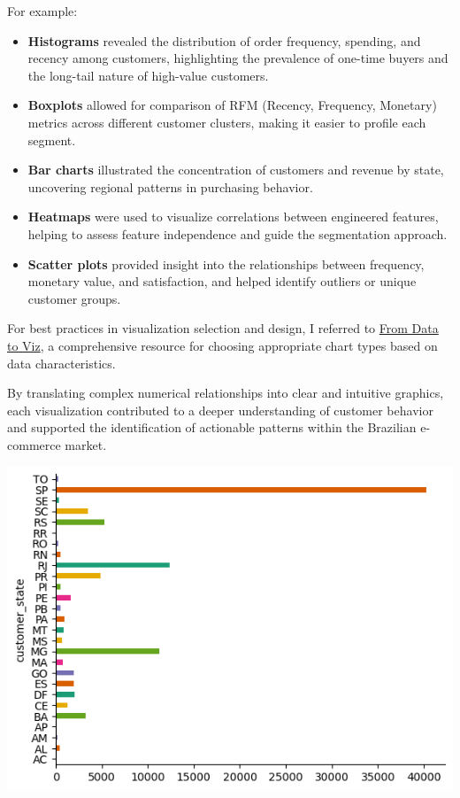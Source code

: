 \documentclass[a4paper]{article}
\begin{document}
\begin{multicols}{2}
For example:
\begin{itemize}
    \item \textbf{Histograms} revealed the distribution of order frequency, spending, and recency among customers, highlighting the prevalence of one-time buyers and the long-tail nature of high-value customers.
    \item \textbf{Boxplots} allowed for comparison of RFM (Recency, Frequency, Monetary) metrics across different customer clusters, making it easier to profile each segment.
    \item \textbf{Bar charts} illustrated the concentration of customers and revenue by state, uncovering regional patterns in purchasing behavior.
    \item \textbf{Heatmaps} were used to visualize correlations between engineered features, helping to assess feature independence and guide the segmentation approach.
    \item \textbf{Scatter plots} provided insight into the relationships between frequency, monetary value, and satisfaction, and helped identify outliers or unique customer groups.
\end{itemize}

For best practices in visualization selection and design, I referred to \href{https://www.data-to-viz.com/}{From Data to Viz}, a comprehensive resource for choosing appropriate chart types based on data characteristics.

By translating complex numerical relationships into clear and intuitive graphics, each visualization contributed to a deeper understanding of customer behavior and supported the identification of actionable patterns within the Brazilian e-commerce market.

\noindent
\begin{minipage}{\columnwidth}
\centering
\includegraphics[width=1\textwidth]{plots/customer_state.png}
\label{fig:Customer Distribution by State} 
\end{minipage}


\end{multicols}
\end{document}
